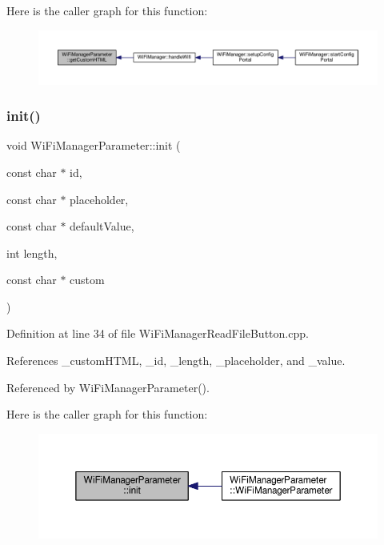 Here is the caller graph for this function\+:\nopagebreak
\begin{figure}[H]
\begin{center}
\leavevmode
\includegraphics[width=350pt]{d7/d08/class_wi_fi_manager_parameter_a596273c189eb40107500cee3ad31b13b_icgraph}
\end{center}
\end{figure}
\mbox{\label{class_wi_fi_manager_parameter_a137b764027d3851a428f3ab185a5660f}} 
\subsubsection{\texorpdfstring{init()}{init()}}
{\footnotesize\ttfamily void Wi\+Fi\+Manager\+Parameter\+::init (\begin{DoxyParamCaption}\item[{const char $\ast$}]{id,  }\item[{const char $\ast$}]{placeholder,  }\item[{const char $\ast$}]{default\+Value,  }\item[{int}]{length,  }\item[{const char $\ast$}]{custom }\end{DoxyParamCaption})\hspace{0.3cm}{\ttfamily [private]}}



Definition at line 34 of file Wi\+Fi\+Manager\+Read\+File\+Button.\+cpp.



References \+\_\+custom\+H\+T\+ML, \+\_\+id, \+\_\+length, \+\_\+placeholder, and \+\_\+value.



Referenced by Wi\+Fi\+Manager\+Parameter().

Here is the caller graph for this function\+:\nopagebreak
\begin{figure}[H]
\begin{center}
\leavevmode
\includegraphics[width=350pt]{d7/d08/class_wi_fi_manager_parameter_a137b764027d3851a428f3ab185a5660f_icgraph}
\end{center}
\end{figure}


